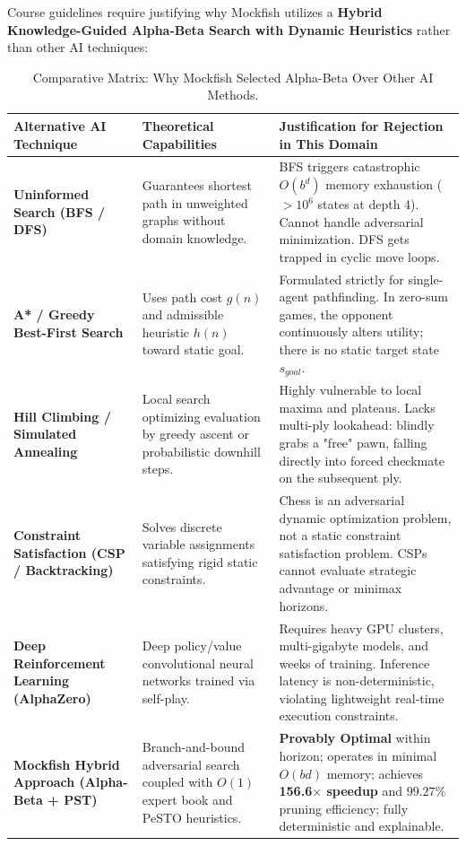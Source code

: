 \documentclass[11pt,a4paper]{article}
\begin{document}
Course guidelines require justifying why Mockfish utilizes a \textbf{Hybrid Knowledge-Guided Alpha-Beta Search with Dynamic Heuristics} rather than other AI techniques:

\begin{table}[H]
\centering
\caption{Comparative Matrix: Why Mockfish Selected Alpha-Beta Over Other AI Methods.}
\label{tab:algorithm_justification}
\small
\renewcommand{\arraystretch}{1.2}
\begin{tabularx}{\textwidth}{@{} L{2.8cm} Y Y @{}}
\toprule
\textbf{Alternative AI Technique} & \textbf{Theoretical Capabilities} & \textbf{Justification for Rejection in This Domain} \\
\midrule
\textbf{Uninformed Search (BFS / DFS)} & Guarantees shortest path in unweighted graphs without domain knowledge. & BFS triggers catastrophic $O(b^d)$ memory exhaustion ($>10^6$ states at depth 4). Cannot handle adversarial minimization. DFS gets trapped in cyclic move loops. \\
\textbf{A* / Greedy Best-First Search} & Uses path cost $g(n)$ and admissible heuristic $h(n)$ toward static goal. & Formulated strictly for single-agent pathfinding. In zero-sum games, the opponent continuously alters utility; there is no static target state $s_{goal}$. \\
\textbf{Hill Climbing / Simulated Annealing} & Local search optimizing evaluation by greedy ascent or probabilistic downhill steps. & Highly vulnerable to local maxima and plateaus. Lacks multi-ply lookahead: blindly grabs a "free" pawn, falling directly into forced checkmate on the subsequent ply. \\
\textbf{Constraint Satisfaction (CSP / Backtracking)} & Solves discrete variable assignments satisfying rigid static constraints. & Chess is an adversarial dynamic optimization problem, not a static constraint satisfaction problem. CSPs cannot evaluate strategic advantage or minimax horizons. \\
\textbf{Deep Reinforcement Learning (AlphaZero)} & Deep policy/value convolutional neural networks trained via self-play. & Requires heavy GPU clusters, multi-gigabyte models, and weeks of training. Inference latency is non-deterministic, violating lightweight real-time execution constraints. \\
\midrule
\textbf{Mockfish Hybrid Approach (Alpha-Beta + PST)} & Branch-and-bound adversarial search coupled with $O(1)$ expert book and PeSTO heuristics. & \textbf{Provably Optimal} within horizon; operates in minimal $O(bd)$ memory; achieves \textbf{156.6$\times$ speedup} and $99.27\%$ pruning efficiency; fully deterministic and explainable. \\
\bottomrule
\end{tabularx}
\end{table}
\end{document}
